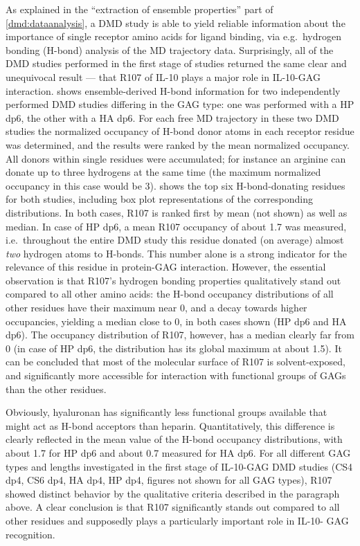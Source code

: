 As explained in the \enquote{extraction of ensemble properties} part of
\cref{dmd:dataanalysis}, a DMD study is able to yield reliable information
about the importance of single receptor amino acids for ligand binding, via
e.g.\ hydrogen bonding (H-bond) analysis of the MD trajectory data.
Surprisingly, all of the DMD studies performed in the first stage of studies
returned the same clear and unequivocal result --- that R107 of IL-10 plays a
major role in IL-10-GAG interaction. 
shows ensemble-derived H-bond information for two independently performed DMD
studies differing in the GAG type: one was performed with a HP dp6, the other
with a HA dp6. For each free MD trajectory in these two DMD studies the
normalized occupancy of H-bond donor atoms in each receptor residue was
determined, and the results were ranked by the mean normalized occupancy. All
donors within single residues were accumulated; for instance an arginine can
donate up to three hydrogens at the same time (the maximum normalized occupancy
in this case would be 3).  shows the
top six H-bond-donating residues for both studies, including box plot
representations of the corresponding distributions. In both cases, R107 is
ranked first by mean (not shown) as well as median. In case of HP dp6, a mean
R107 occupancy of about 1.7 was measured, i.e.\ throughout the entire DMD study
this residue donated (on average) almost \textit{two} hydrogen atoms to H-bonds.
This number alone is a strong indicator for the relevance of this residue in
protein-GAG interaction. However, the essential observation is that R107's
hydrogen bonding properties qualitatively stand out compared to all other amino
acids: the H-bond occupancy distributions of all other residues have their
maximum near 0, and a decay towards higher occupancies, yielding a median close
to 0, in both cases shown (HP dp6 and HA dp6). The occupancy distribution of
R107, however, has a median clearly far from 0 (in case of HP dp6, the
distribution has its global maximum at about 1.5). It can be concluded that most
of the molecular surface of R107 is solvent-exposed, and significantly more
accessible for interaction with functional groups of GAGs than the other
residues.

Obviously, hyaluronan has significantly less functional groups available that
might act as H-bond acceptors than heparin. Quantitatively, this difference is
clearly reflected in the mean value of the H-bond occupancy distributions, with
about 1.7 for HP dp6 and about 0.7 measured for HA dp6. For all different GAG
types and lengths investigated in the first stage of IL-10-GAG DMD studies (CS4
dp4, CS6 dp4, HA dp4, HP dp4, figures not shown for all GAG types), R107 showed
distinct behavior by the qualitative criteria described in the paragraph above.
A clear conclusion is that R107 significantly stands out compared to all other
residues and supposedly plays a particularly important role in IL-10- GAG
recognition.


